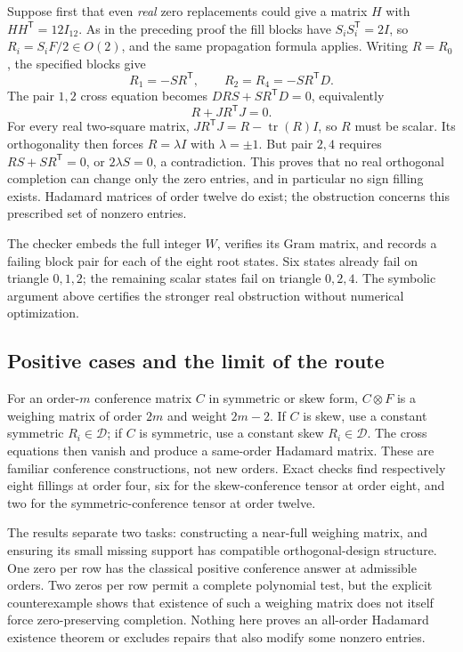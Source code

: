 Suppose first that even \emph{real} zero replacements could give
a matrix $H$ with $HH^{\mathsf T}=12I_{12}$. As in the preceding
proof the fill blocks have $S_iS_i^{\mathsf T}=2I$, so
$R_i=S_iF/2\in O(2)$, and the same propagation formula applies.
Writing $R=R_0$, the specified blocks give
\[
 R_1=-SR^{\mathsf T},\qquad
 R_2=R_4=-SR^{\mathsf T}D.
\]
The pair $1,2$ cross equation becomes
$DRS+SR^{\mathsf T}D=0$, equivalently
\[
 R+JR^{\mathsf T}J=0.
\]
For every real two-square matrix,
$JR^{\mathsf T}J=R-\operatorname{tr}(R)I$, so $R$ must be
scalar. Its orthogonality then forces $R=\lambda I$ with
$\lambda=\pm1$. But pair $2,4$ requires
$RS+SR^{\mathsf T}=0$, or $2\lambda S=0$, a contradiction.
This proves that no real orthogonal completion can change only
the zero entries, and in particular no sign filling exists.
Hadamard matrices of order twelve do exist; the obstruction
concerns this prescribed set of nonzero entries.

The checker embeds the full integer $W$, verifies its Gram matrix,
and records a failing block pair for each of the eight root states.
Six states already fail on triangle $0,1,2$; the remaining scalar
states fail on triangle $0,2,4$. The symbolic argument above
certifies the stronger real obstruction without numerical optimization.

\subsection{Positive cases and the limit of the route}
For an order-$m$ conference matrix $C$ in symmetric or skew form,
$C\otimes F$ is a weighing matrix of order $2m$ and weight $2m-2$.
If $C$ is skew, use a constant symmetric $R_i\in\mathcal D$;
if $C$ is symmetric, use a constant skew $R_i\in\mathcal D$.
The cross equations then vanish and produce a same-order Hadamard
matrix. These are familiar conference constructions, not new orders.
Exact checks find respectively eight fillings at order four,
six for the skew-conference tensor at order eight, and two for
the symmetric-conference tensor at order twelve.

The results separate two tasks: constructing a near-full weighing
matrix, and ensuring its small missing support has compatible
orthogonal-design structure. One zero per row has the classical
positive conference answer at admissible orders. Two zeros per
row permit a complete polynomial test, but the explicit counterexample
shows that existence of such a weighing matrix does not itself
force zero-preserving completion. Nothing here proves an all-order
Hadamard existence theorem or excludes repairs that also modify
some nonzero entries.

